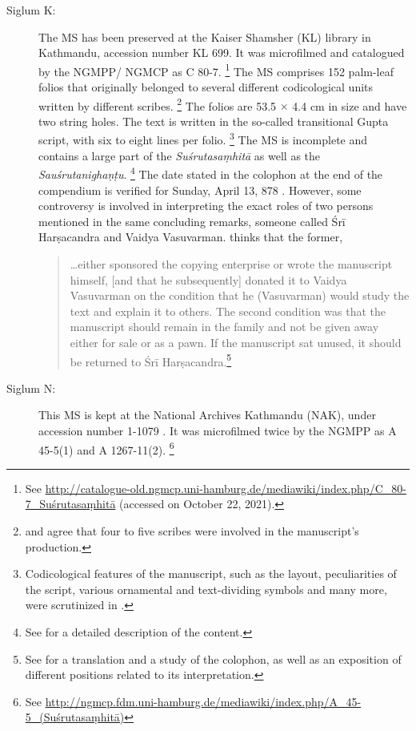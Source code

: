 \begin{description}
\item[Siglum K:] The MS has been preserved at the Kaiser Shamsher (KL) library in Kathmandu, accession number KL 699. It was microfilmed and catalogued by the NGMPP/ NGMCP as C 80-7.%
    \footnote{%
    See 
    \url{http://catalogue-old.ngmcp.uni-hamburg.de/mediawiki/index.php/C_80-7_Suśrutasaṃhitā}
     (accessed on October 22, 2021).%
    } 
The MS comprises 152 palm-leaf folios that originally belonged to several different codicological units written by different scribes.%
    \footnote{%
    \textcites[46]{bhat-2020} and \textcites[11]{kleb-2021b} agree that four to five scribes were involved in the manuscript's production.
    } 
The folios are 53.5 $\times$ 4.4 cm in size and have two string holes.  The text is written in the so-called transitional Gupta script, with six to eight lines per folio.%
    \footnote{%
    Codicological features of the manuscript, such as the layout, peculiarities of the script, various ornamental and text-dividing symbols and many more, were scrutinized in \textcites{bhat-2020}.
    }
The MS is incomplete and contains a large part of the \emph{Suśrutasaṃhitā} as well as the \emph{Sauśrutanighaṇṭu}.%
    \footnote{%
    See \textcites[11]{kleb-2021b} for a detailed description of the content.%
    }
The date stated in the colophon at the end of the compendium is verified for Sunday, April 13, 
878 \CE. However, some controversy is involved in interpreting the exact roles of two 
persons 
mentioned in the same concluding remarks, someone called Śrī Harṣacandra and Vaidya 
Vasuvarman. \textcites[16]{kleb-2021b} thinks that the former,
\begin{quote}
\ldots either sponsored the copying enterprise or wrote the manuscript himself,
[and that he subsequently]
    donated it to Vaidya Vasuvarman on the condition that he (Vasuvarman)
would study the text and explain it to others. The second condition was that
the manuscript should remain in the family and not be given away either for
sale or as a pawn. If the manuscript sat unused, it should be returned to Śrī
Harṣacandra.\footnote{See \textcites[13--17]{kleb-2021b} for a translation and
    a study of the colophon, as well as an exposition of different positions
    related to its interpretation.}
\end{quote}
\item[Siglum N:] This MS is kept at the National Archives Kathmandu (NAK), under accession number 1-1079 . It was microfilmed twice by the NGMPP as A 45-5(1) and A 1267-11(2).%
    \footnote{%
See 
\url{http://ngmcp.fdm.uni-hamburg.de/mediawiki/index.php/A_45-5_(Suśrutasaṃhitā)}
}
\end{description}
